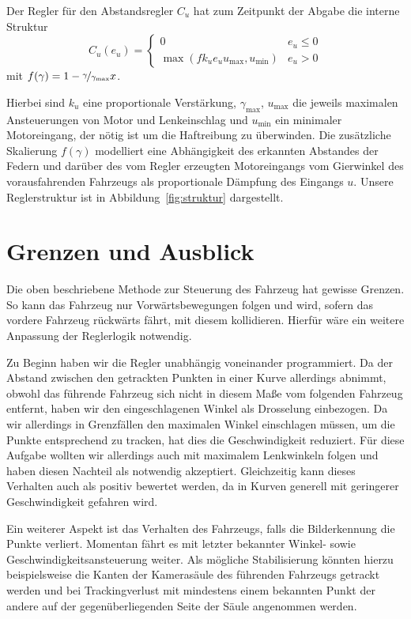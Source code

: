 \documentclass[10pt]{article}
\begin{document}
    Der Regler für den Abstandsregler $C_{u}$ hat zum Zeitpunkt der Abgabe die interne Struktur \[
    C_{u}(e_{u}) = \begin{cases} 0 & e_{u} \leq 0 \\
    \max (fk_{u}e_{u}u_{\max},u_{\min}) &  e_{u} > 0
    \end{cases}
    \]
    mit $f(\gamma) = 1 - \nicefrac{\gamma}{\gamma_{\max}}x$.

    Hierbei sind $k_{u}$ eine proportionale Verstärkung, $\gamma_{\max}$, $u_{\max}$ die jeweils maximalen Ansteuerungen von Motor und Lenkeinschlag und $u_{\min}$ ein minimaler Motoreingang, der nötig ist um die Haftreibung zu überwinden.
    Die zusätzliche Skalierung $f(\gamma)$ modelliert eine Abhängigkeit des erkannten Abstandes der Federn und darüber des vom Regler erzeugten Motoreingangs vom Gierwinkel des vorausfahrenden Fahrzeugs als proportionale Dämpfung des Eingangs $u$.
    Unsere Reglerstruktur ist in Abbildung~\ref{fig:struktur} dargestellt.


\section{Grenzen und Ausblick}
    Die oben beschriebene Methode zur Steuerung des Fahrzeug hat gewisse Grenzen.
    So kann das Fahrzeug nur Vorwärtsbewegungen folgen und wird, sofern das vordere Fahrzeug rückwärts fährt, mit diesem kollidieren.
    Hierfür wäre ein weitere Anpassung der Reglerlogik notwendig.

    Zu Beginn haben wir die Regler unabhängig voneinander programmiert.
    Da der Abstand zwischen den getrackten Punkten in einer Kurve allerdings abnimmt, obwohl das führende Fahrzeug sich nicht in diesem Maße vom folgenden Fahrzeug entfernt, haben wir den eingeschlagenen Winkel als Drosselung einbezogen.
    Da wir allerdings in Grenzfällen den maximalen Winkel einschlagen müssen, um die Punkte entsprechend zu tracken, hat dies die Geschwindigkeit reduziert.
    Für diese Aufgabe wollten wir allerdings auch mit maximalem Lenkwinkeln folgen und haben diesen Nachteil als notwendig akzeptiert.
    Gleichzeitig kann dieses Verhalten auch als positiv bewertet werden, da in Kurven generell mit geringerer Geschwindigkeit gefahren wird.

    Ein weiterer Aspekt ist das Verhalten des Fahrzeugs, falls die Bilderkennung die Punkte verliert.
    Momentan fährt es mit letzter bekannter Winkel- sowie Geschwindigkeitsansteuerung weiter.
    Als mögliche Stabilisierung könnten hierzu beispielsweise die Kanten der Kamerasäule des führenden Fahrzeugs getrackt werden und bei Trackingverlust mit mindestens einem bekannten Punkt der andere auf der gegenüberliegenden Seite der Säule angenommen werden.
\end{document}
